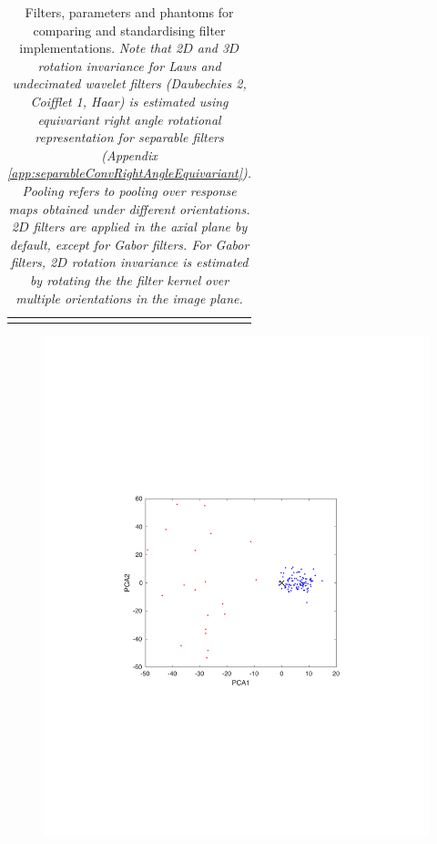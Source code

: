 \documentclass[fleqn,a4paper,oneside,openany]{book}
\begin{document}
\begin{longtable}{cp{3cm}cp{7.7cm}}
    \bottomrule
    \caption{\normalsize Filters, parameters and phantoms for comparing and standardising filter implementations. \textit{Note that 2\(D\) and 3\(D\) rotation invariance for Laws and undecimated wavelet filters (Daubechies 2, Coifflet 1, Haar) is estimated using equivariant right angle rotational representation for separable filters (Appendix \ref{app:separableConvRightAngleEquivariant}). Pooling refers to pooling over response maps obtained under different orientations. 2\(D\) filters are applied in the axial plane by default, except for Gabor filters. For Gabor filters, 2$D$ rotation invariance is estimated by rotating the the filter kernel over multiple orientations in the image plane.}} \label{tab:benchmark_filter_settings}
\end{longtable}
\normalsize
%
\FloatBarrier
%
\begin{figure}[h!]
\centering
\includegraphics[trim = 0 0 0 0, clip, scale=.7]{PCAconsensus.pdf}
\hspace{0.5cm}

\end{figure}
\end{document}
